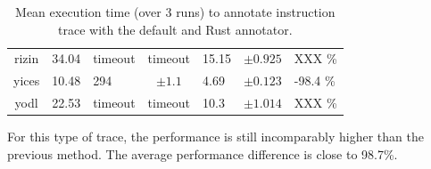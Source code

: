 \begin{table}[h]
{\begin{tabular}{ccgcgcg}
            rizin                                & 34.04                                & timeout                                   & timeout                                & 15.15                     & $ \pm 0.925 $ & XXX \%    \\
            yices                                & 10.48                                & 294                                       & $ \pm 1.1 $                            & 4.69                      & $ \pm 0.123 $ & -98.4 \%  \\
            yodl                                 & 22.53                                & timeout                                   & timeout                                & 10.3                      & $ \pm 1.014 $ & XXX \%    \\
            \bottomrule
        \end{tabular}
    }
    \caption{Mean execution time (over 3 runs) to annotate instruction trace with the default and Rust annotator.}
    \label{table:annotate-instruction-trace-3}
\end{table}

For this type of trace, the performance is still incomparably higher than the previous method. The average performance difference is close to 98.7\%.